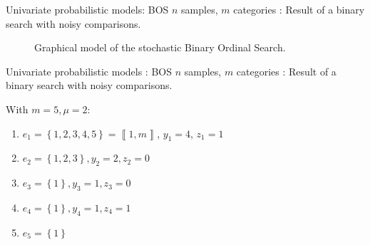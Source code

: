 \documentclass{beamer}
\newcommand{\bbrack}[1]{\left\llbracket#1\right\rrbracket}
\newcommand{\set}[1]{\ensuremath{\left\{ #1 \right\}}}
\begin{document}
\begin{frame}{Univariate probabilistic models: BOS}
    $n$ samples, $m$ categories
    : Result of a binary search with noisy comparisons.

    \begin{figure}[htbp]
        \centering
        \begin{adjustbox}{width=0.8\textwidth}
        \end{adjustbox}
        \caption*{Graphical model of the stochastic Binary Ordinal Search.}
        \label{fig:graphical_model}
    \end{figure}
\end{frame}

\begin{frame}{Univariate probabilistic models : BOS}
    $n$ samples, $m$ categories
    : Result of a binary search with noisy comparisons.

    \begin{example}
        With $m = 5, \mu = 2$:
        \begin{enumerate}
            \item $e_1 = \set{1, 2, 3, 4, 5} = \bbrack{1, m}$, $y_1 = 4$, $z_1 = 1$
            \item $e_2 = \set{1, 2, 3}, y_2 = 2, z_2 = 0$
            \item $e_3 = \set{1}, y_3 = 1, z_3 = 0$
            \item $e_4 = \set{1}, y_4 = 1, z_4 = 1$
            \item $e_5 = \set{1}$
        \end{enumerate}
    \end{example}
\end{frame}
\end{document}
